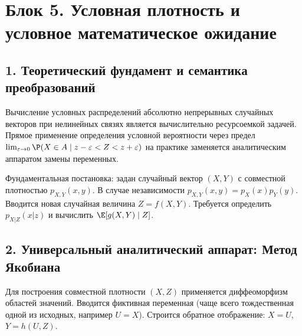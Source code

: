 \section*{Блок 5. Условная плотность и условное математическое ожидание}

\subsection*{1. Теоретический фундамент и семантика преобразований}

Вычисление условных распределений абсолютно непрерывных случайных векторов при нелинейных связях является вычислительно ресурсоемкой задачей. Прямое применение определения условной вероятности через предел $ \lim_{\varepsilon \to 0} \P(X \in A \mid z - \varepsilon < Z < z + \varepsilon) $ на практике заменяется аналитическим аппаратом замены переменных.

Фундаментальная постановка: задан случайный вектор $(X, Y)$ с совместной плотностью $p_{X,Y}(x,y)$. В случае независимости $p_{X,Y}(x,y) = p_X(x)p_Y(y)$. Вводится новая случайная величина $Z = f(X,Y)$. Требуется определить $p_{X|Z}(x|z)$ и вычислить $\E[g(X,Y) \mid Z]$.

\subsection*{2. Универсальный аналитический аппарат: Метод Якобиана}

Для построения совместной плотности $(X, Z)$ применяется диффеоморфизм областей значений. Вводится фиктивная переменная (чаще всего тождественная одной из исходных, например $U = X$). Строится обратное отображение: $X = U$, $Y = h(U, Z)$.

